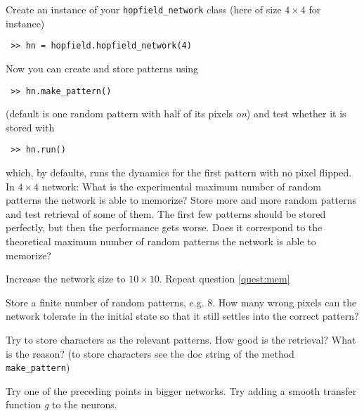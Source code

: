 \documentclass[12pt]{article}
\begin{document}
\begin{Exercise}
\newpage

Create an instance of your \verb|hopfield_network| class (here of size $4\times4$ for instance)
\begin{verbatim}
 >> hn = hopfield.hopfield_network(4)
\end{verbatim}
Now you can create and store patterns using
\begin{verbatim}
 >> hn.make_pattern()
\end{verbatim}
(default is one random pattern with half of its pixels \emph{on}) and test whether it is stored with
\begin{verbatim}
 >> hn.run()
\end{verbatim}
which, by defaults, runs the dynamics for the first pattern with no pixel flipped.\\

\Question \label{quest:mem} In ${4\times 4}$ network: 
What is the experimental maximum number of random patterns the network is able to memorize? Store more and more random patterns and test retrieval of some of them. The first few patterns should be stored perfectly, but then the performance gets worse. Does it correspond to the theoretical maximum number of random patterns the network is able to memorize?

\Question  Increase the network size to ${10\times 10}$. Repeat question \ref{quest:mem}

\Question
Store a finite number of random patterns, e.g. 8. How many wrong pixels can the network tolerate in the initial state so that it still settles into the correct pattern?

\Question
Try to store characters as the relevant patterns. How good is the retrieval? What is the reason? (to store characters see the doc string of the method \verb|make_pattern|)

\Question[title=Bonus]
Try one of the preceding points in bigger networks. Try adding a smooth transfer function \textit{g} to the neurons.

\end{Exercise}
\end{document}
